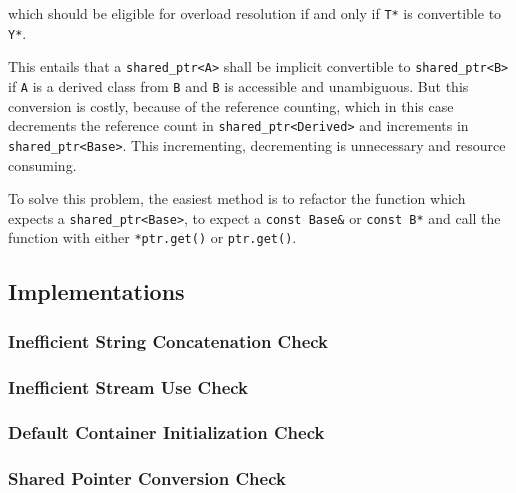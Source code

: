 \cite[\S20.8.2.2.1]{cpp_standard}
 which should be eligible for overload resolution if and only  if \verb|T*| is convertible to \verb|Y*|. \medskip
 \par This entails that a \verb|shared_ptr<A>| shall be implicit convertible to \verb|shared_ptr<B>| if \verb|A| is a derived class from \verb|B| and \verb|B| is accessible and unambiguous. But this conversion is costly, because of the reference counting, which in this case decrements the reference count in \verb|shared_ptr<Derived>| and increments in \verb|shared_ptr<Base>|. This incrementing, decrementing is unnecessary and resource consuming. \medskip
 \par To solve this problem, the easiest method is to refactor the function which expects a \verb|shared_ptr<Base>|, to expect a \verb|const Base&| or \verb|const B*| and call the function with either \verb|*ptr.get()| or \verb|ptr.get()|.
\subsection{Implementations}
\subsubsection{Inefficient String Concatenation Check}
\subsubsection{Inefficient Stream Use Check}
\subsubsection{Default Container Initialization Check}
\subsubsection{Shared Pointer Conversion Check}
